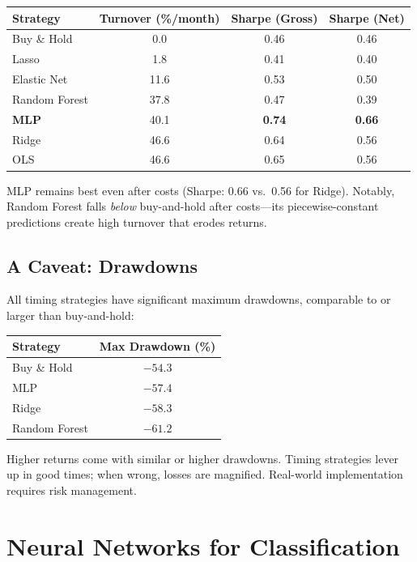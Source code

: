 \documentclass[11pt,a4paper]{article}
\begin{document}
\begin{center}
\begin{tabular}{lccc}
\toprule
\textbf{Strategy} & \textbf{Turnover (\%/month)} & \textbf{Sharpe (Gross)} & \textbf{Sharpe (Net)} \\
\midrule
Buy \& Hold & 0.0 & 0.46 & 0.46 \\
\midrule
Lasso & 1.8 & 0.41 & 0.40 \\
Elastic Net & 11.6 & 0.53 & 0.50 \\
Random Forest & 37.8 & 0.47 & 0.39 \\
\midrule
\textbf{MLP} & 40.1 & \textbf{0.74} & \textbf{0.66} \\
Ridge & 46.6 & 0.64 & 0.56 \\
OLS & 46.6 & 0.65 & 0.56 \\
\bottomrule
\end{tabular}
\end{center}

MLP remains best even after costs (Sharpe: 0.66 vs.\ 0.56 for Ridge). Notably, Random Forest falls \textit{below} buy-and-hold after costs---its piecewise-constant predictions create high turnover that erodes returns.

\subsection{A Caveat: Drawdowns}

All timing strategies have significant maximum drawdowns, comparable to or larger than buy-and-hold:

\begin{center}
\begin{tabular}{lc}
\toprule
\textbf{Strategy} & \textbf{Max Drawdown (\%)} \\
\midrule
Buy \& Hold & $-54.3$ \\
MLP & $-57.4$ \\
Ridge & $-58.3$ \\
Random Forest & $-61.2$ \\
\bottomrule
\end{tabular}
\end{center}

Higher returns come with similar or higher drawdowns. Timing strategies lever up in good times; when wrong, losses are magnified. Real-world implementation requires risk management.

\section{Neural Networks for Classification}
\end{document}
